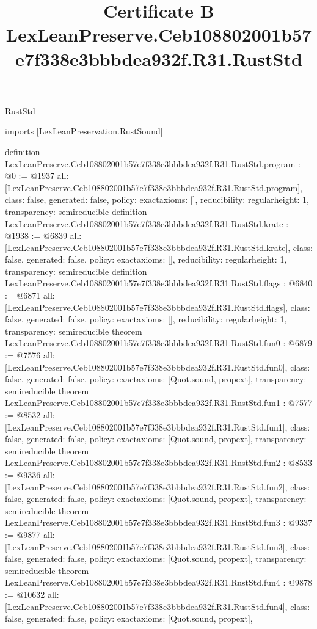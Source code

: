 \begin{lexlean}{RustStd}
\title{Certificate B LexLeanPreserve.Ceb108802001b57e7f338e3bbbdea932f.R31.RustStd}
\begin{coremodule}
imports [LexLeanPreservation.RustSound]

definition LexLeanPreserve.Ceb108802001b57e7f338e3bbbdea932f.R31.RustStd.program : @0 := @1937 {
  all: [LexLeanPreserve.Ceb108802001b57e7f338e3bbbdea932f.R31.RustStd.program],
  class: false,
  generated: false,
  policy: exact{axioms: []},
  reducibility: regular{height: 1},
  transparency: semireducible
}
definition LexLeanPreserve.Ceb108802001b57e7f338e3bbbdea932f.R31.RustStd.krate : @1938 := @6839 {
  all: [LexLeanPreserve.Ceb108802001b57e7f338e3bbbdea932f.R31.RustStd.krate],
  class: false,
  generated: false,
  policy: exact{axioms: []},
  reducibility: regular{height: 1},
  transparency: semireducible
}
definition LexLeanPreserve.Ceb108802001b57e7f338e3bbbdea932f.R31.RustStd.flags : @6840 := @6871 {
  all: [LexLeanPreserve.Ceb108802001b57e7f338e3bbbdea932f.R31.RustStd.flags],
  class: false,
  generated: false,
  policy: exact{axioms: []},
  reducibility: regular{height: 1},
  transparency: semireducible
}
theorem LexLeanPreserve.Ceb108802001b57e7f338e3bbbdea932f.R31.RustStd.fun0 : @6879 := @7576 {
  all: [LexLeanPreserve.Ceb108802001b57e7f338e3bbbdea932f.R31.RustStd.fun0],
  class: false,
  generated: false,
  policy: exact{axioms: [Quot.sound, propext]},
  transparency: semireducible
}
theorem LexLeanPreserve.Ceb108802001b57e7f338e3bbbdea932f.R31.RustStd.fun1 : @7577 := @8532 {
  all: [LexLeanPreserve.Ceb108802001b57e7f338e3bbbdea932f.R31.RustStd.fun1],
  class: false,
  generated: false,
  policy: exact{axioms: [Quot.sound, propext]},
  transparency: semireducible
}
theorem LexLeanPreserve.Ceb108802001b57e7f338e3bbbdea932f.R31.RustStd.fun2 : @8533 := @9336 {
  all: [LexLeanPreserve.Ceb108802001b57e7f338e3bbbdea932f.R31.RustStd.fun2],
  class: false,
  generated: false,
  policy: exact{axioms: [Quot.sound, propext]},
  transparency: semireducible
}
theorem LexLeanPreserve.Ceb108802001b57e7f338e3bbbdea932f.R31.RustStd.fun3 : @9337 := @9877 {
  all: [LexLeanPreserve.Ceb108802001b57e7f338e3bbbdea932f.R31.RustStd.fun3],
  class: false,
  generated: false,
  policy: exact{axioms: [Quot.sound, propext]},
  transparency: semireducible
}
theorem LexLeanPreserve.Ceb108802001b57e7f338e3bbbdea932f.R31.RustStd.fun4 : @9878 := @10632 {
  all: [LexLeanPreserve.Ceb108802001b57e7f338e3bbbdea932f.R31.RustStd.fun4],
  class: false,
  generated: false,
  policy: exact{axioms: [Quot.sound, propext]},
}
\end{coremodule}
\end{lexlean}
